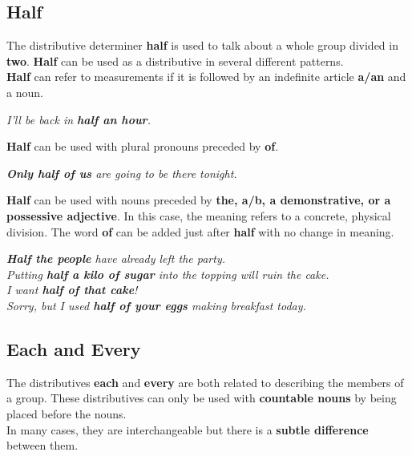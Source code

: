 \documentclass[hidelinks,10pt,a4paper]{article}
\begin{document}
\subsection{Half}
The distributive determiner \textbf{half} is used to talk about a whole group divided in \textbf{two}. \textbf{Half} can be used as a distributive in several different patterns.\\
\textbf{Half} can refer to measurements if it is followed by an indefinite article \textbf{a/an} and a noun.
\begin{center}
\textit{I'll be back in \textbf{half an hour}.}
\end{center}
\textbf{Half} can be used with plural pronouns preceded by \textbf{of}.
\begin{center}
\textit{ \textbf{Only half of us} are going to be there tonight.}
\end{center}
\textbf{Half} can be used with nouns preceded by \textbf{the, a/b, a demonstrative, or a possessive adjective}. In this case, the meaning refers to a concrete, physical division.
The word \textbf{of} can be added just after \textbf{half} with no change in meaning.
\begin{center}
\textit{ \textbf{Half the people} have already left the party.\\
Putting \textbf{half a kilo of sugar} into the topping will ruin the cake.\\
I want \textbf{half of that cake}!\\
Sorry, but I used \textbf{half of your eggs} making breakfast today.}
\end{center}

\subsection{Each and Every}
The distributives \textbf{each} and \textbf{every} are both related to describing the members of a group. These distributives can only be used with \textbf{countable nouns} by being placed before the nouns. \\
\indent In many cases, they are interchangeable but there is a \textbf{subtle difference} between them.
\end{document}
